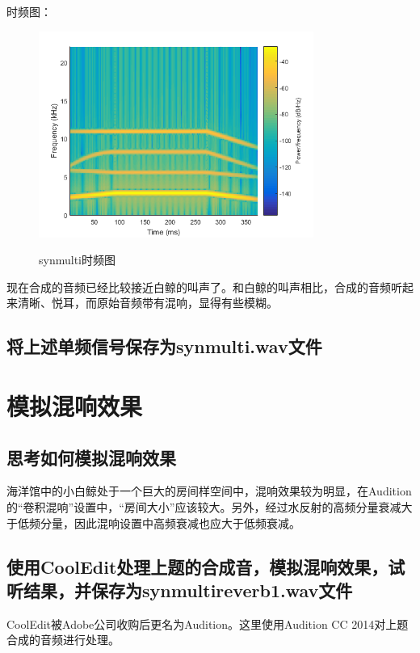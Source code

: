 \documentclass{article}
\begin{document}
            时频图：
            \begin{figure}[htb]
                \centering
                \includegraphics[width=9cm]{figure12.png}
                \label{fig:synmulti-ft}\caption{synmulti时频图}
            \end{figure}

            现在合成的音频已经比较接近白鲸的叫声了。和白鲸的叫声相比，合成的音频听起来清晰、悦耳，而原始音频带有混响，显得有些模糊。

        \subsection{将上述单频信号保存为synmulti.wav文件}

    \section{模拟混响效果}
        \subsection{思考如何模拟混响效果}
            海洋馆中的小白鲸处于一个巨大的房间样空间中，混响效果较为明显，在Audition的“卷积混响”设置中，“房间大小”应该较大。另外，经过水反射的高频分量衰减大于低频分量，因此混响设置中高频衰减也应大于低频衰减。

        \subsection{使用CoolEdit处理上题的合成音，模拟混响效果，试听结果，并保存为synmultireverb1.wav文件}
            CoolEdit被Adobe公司收购后更名为Audition。这里使用Audition CC 2014对上题合成的音频进行处理。
            
\end{document}
